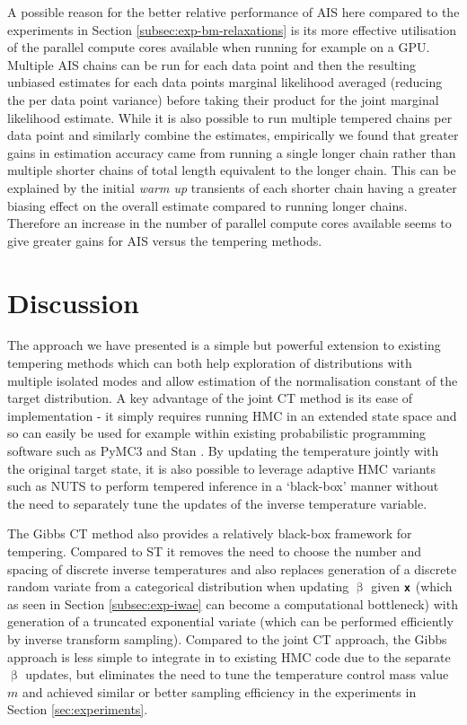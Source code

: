 A possible reason for the better relative performance of \ac{AIS} here compared to the experiments in Section \ref{subsec:exp-bm-relaxations} is its more effective utilisation of the parallel compute cores available when running for example on a \ac{GPU}. Multiple \ac{AIS} chains can be run for each data point and then the resulting unbiased estimates for each data points marginal likelihood averaged (reducing the per data point variance) before taking their product for the joint marginal likelihood estimate. While it is also possible to run multiple tempered chains per data point and similarly combine the estimates, empirically we found that greater gains in estimation accuracy came from running a single longer chain rather than multiple shorter chains of total length equivalent to the longer chain. This can be explained by the initial \emph{warm up} transients of each shorter chain having a greater biasing effect on the overall estimate compared to running longer chains. Therefore an increase in the number of parallel compute cores available seems to give greater gains for \ac{AIS} versus the tempering methods.

\section{Discussion}

The approach we have presented is a simple but powerful extension to existing tempering methods which can both help exploration of distributions with multiple isolated modes and allow estimation of the normalisation constant of the target distribution. A key advantage of the joint \ac{CT} method is its ease of implementation - it simply requires running \ac{HMC} in an extended state space and so can easily be used for example within existing probabilistic programming software such as PyMC3 \citep{salvatier2016probabilistic} and Stan \citep{carpenter2016stan}. By updating the temperature jointly with the original target state, it is also possible to leverage adaptive \ac{HMC} variants such as \ac{NUTS} \citep{hoffman2014no} to perform tempered inference in a `black-box' manner without the need to separately tune the updates of the inverse temperature variable.

The Gibbs \ac{CT} method also provides a relatively black-box framework for tempering. Compared to \ac{ST} it removes the need to choose the number and spacing of discrete inverse temperatures and also replaces generation of a discrete random variate from a categorical distribution when updating $\upbeta$ given $\boldsymbol{\mathsf{x}}$ (which as seen in Section \ref{subsec:exp-iwae} can become a computational bottleneck) with generation of a truncated exponential variate (which can be performed efficiently by inverse transform sampling). Compared to the joint \ac{CT} approach, the Gibbs approach is less simple to integrate in to existing \ac{HMC} code due to the separate $\upbeta$ updates, but eliminates the need to tune the temperature control mass value $m$ and achieved similar or better sampling efficiency in the experiments in Section \ref{sec:experiments}.

